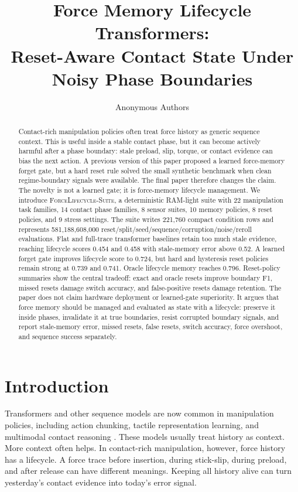 \documentclass{article}
\title{Force Memory Lifecycle Transformers:\\ Reset-Aware Contact State Under Noisy Phase Boundaries}
\author{Anonymous Authors}
\newcommand{\suite}{\textsc{ForceLifecycle-Suite}}
\begin{document}
\maketitle

\begin{abstract}
Contact-rich manipulation policies often treat force history as generic sequence
context. This is useful inside a stable contact phase, but it can become
actively harmful after a phase boundary: stale preload, slip, torque, or contact
evidence can bias the next action. A previous version of this paper proposed a
learned force-memory forget gate, but a hard reset rule solved the small
synthetic benchmark when clean regime-boundary signals were available. The final
paper therefore changes the claim. The novelty is not a learned gate; it is
force-memory lifecycle management. We introduce \suite{}, a deterministic
RAM-light suite with 22 manipulation task families, 14 contact phase families, 8
sensor suites, 10 memory policies, 8 reset policies, and 9 stress settings. The
suite writes 221,760 compact condition rows and represents 581,188,608,000
reset/split/seed/sequence/corruption/noise/reroll evaluations. Flat and
full-trace transformer baselines retain too much stale evidence, reaching
lifecycle scores 0.454 and 0.458 with stale-memory error above 0.52. A learned
forget gate improves lifecycle score to 0.724, but hard and hysteresis reset
policies remain strong at 0.739 and 0.741. Oracle lifecycle memory reaches
0.796. Reset-policy summaries show the central tradeoff: exact and oracle
resets improve boundary F1, missed resets damage switch accuracy, and
false-positive resets damage retention. The paper does not claim hardware
deployment or learned-gate superiority. It argues that force memory should be
managed and evaluated as state with a lifecycle: preserve it inside phases,
invalidate it at true boundaries, resist corrupted boundary signals, and report
stale-memory error, missed resets, false resets, switch accuracy, force
overshoot, and sequence success separately.
\end{abstract}

\section{Introduction}

Transformers and other sequence models are now common in manipulation policies,
including action chunking, tactile representation learning, and multimodal
contact reasoning \citep{zhou2023act,chen2022vtt,zhao2024t3}. These models
usually treat history as context. More context often helps. In contact-rich
manipulation, however, force history has a lifecycle. A force trace before
insertion, during stick-slip, during preload, and after release can have
different meanings. Keeping all history alive can turn yesterday's contact
evidence into today's error signal.
\end{document}
